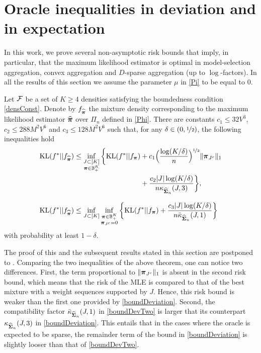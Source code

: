 \section[Oracles inequalities]{Oracle inequalities in deviation and in expectation} %
\label{sec:main_results}

In this work, we prove several non-asymptotic risk bounds that
imply, in particular, that the maximum likelihood estimator is optimal in model-selection aggregation,
convex aggregation and $D$-sparse aggregation (up to $\log$-factors). In all the results of this section
we assume the parameter $\mu$ in \eqref{Pi} to be equal to $0$.
\begin{theorem}
	\label{maintheo1}
	Let $\cal F$ be a set of $K\ge 4$ densities satisfying the boundedness condition \eqref{densConst}.
	Denote by $f_{\widehat{\boldsymbol \pi}}$ the mixture density corresponding to the maximum likelihood estimator
	$\widehat{\boldsymbol \pi}$ over $\Pi_n$ defined in \eqref{Phi}. There are constants $c_1\le 32V^3$,
	$c_2\le 288 M^2V^6$ and $c_3\le 128 M^2V^6$ such that, for any $\delta \in (0,\nicefrac12)$, the following
	inequalities hold
	\begin{align}
	\KL(f^*|| f_{\hat\bpi}) &\leq \inf_{\substack{J\subset [K]\\\bpi \in \BB_+^K}} 
	\bigg\{ \KL(f^*|| f_{\bpi}) + c_1\Big(\frac{\log(K/\delta)}{n}\Big)^{\nicefrac12} \|\bpi_{J^c}\|_1\nonumber\\
	&\phantom{{}\leq \inf_{\substack{J\subset [K]\\\bpi \in \BB_+^K}} 
	\bigg\{ \KL(f^*|| f_{\bpi})}+\frac{c_2|J|\log(K/\delta)}{n\kappa_{\hat\bSigma_n}(J,3)} \bigg\},\label{boundDeviation}\\
	\KL(f^*|| f_{\hat\bpi}) &\leq \inf_{J\subset [K]}\inf_{\substack{\bpi \in \BB_+^K\\ \bpi_{J^c}=0}}
	\bigg\{ \KL(f^*|| f_{\bpi}) +\frac{c_3|J|\log(K/\delta)}{n\bar\kappa_{\hat\bSigma_n}(J,1)}
	\bigg\} \label{boundDevTwo}
	\end{align}
	with probability at least $1-\delta$.
\end{theorem}

The proof of this and the subsequent results stated in this section are postponed to .
Comparing the two inequalities of the above theorem, one can notice two differences. First, the term
proportional to $\|\boldsymbol \pi_{J^c}\|_1$  is absent in the second risk bound, which means that
the risk of the MLE is compared to that of the best mixture with a weight sequences supported by $J$.
Hence, this risk bound is weaker than the first one provided by \eqref{boundDeviation}. Second,
the compatibility factor $\bar\kappa_{\widehat{\boldsymbol\Sigma}_n}(J,1)$ in \eqref{boundDevTwo} is larger that
its counterpart $\kappa_{\widehat{\boldsymbol\Sigma}_n}(J,3)$ in \eqref{boundDeviation}. This entails that in the cases
where the oracle is expected to be sparse, the remainder term of the bound in \eqref{boundDeviation}
is slightly looser than that of \eqref{boundDevTwo}.


